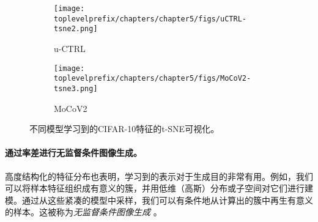 \documentclass[../../book-main.tex]{subfiles}
\begin{document}
\begin{figure}[ht!]
    \begin{subfigure}[t]{0.46\textwidth}
        \centering
        \texttt{[image: \\toplevelprefix/chapters/chapter5/figs/uCTRL-tsne2.png]}
        \caption{u-CTRL}
    \end{subfigure}
    \hfill
    \begin{subfigure}[t]{0.46\textwidth}
        \centering
        \texttt{[image: \\toplevelprefix/chapters/chapter5/figs/MoCoV2-tsne3.png]}
        \caption{MoCoV2}
    \end{subfigure}
    \caption{\small 不同模型学习到的CIFAR-10特征的t-SNE可视化。} 
    \label{fig:tsne}
\end{figure}

\paragraph{通过率差进行无监督条件图像生成。}
高度结构化的特征分布也表明，学习到的表示对于生成目的非常有用。例如，我们可以将样本特征组织成有意义的簇，并用低维（高斯）分布或子空间对它们进行建模。通过从这些紧凑的模型中采样，我们可以有条件地从计算出的簇中再生有意义的样本。这被称为{\em 无监督条件图像生成} \cite{hwang2021stein}。
\end{document}
